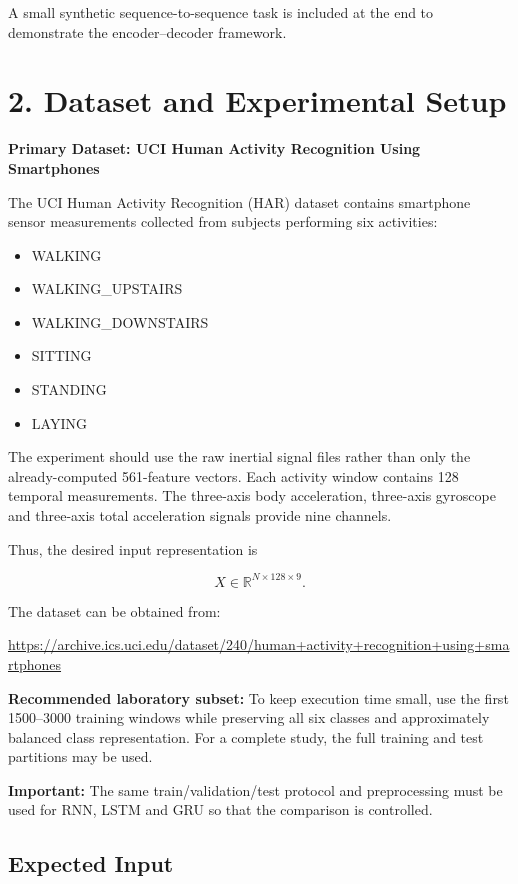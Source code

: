 \documentclass[10pt]{article}
\begin{document}
A small synthetic sequence-to-sequence task is included at the end to
demonstrate the encoder--decoder framework.

\section*{2. Dataset and Experimental Setup}

\textbf{Primary Dataset: UCI Human Activity Recognition Using Smartphones}

The UCI Human Activity Recognition (HAR) dataset contains smartphone sensor
measurements collected from subjects performing six activities:

\begin{itemize}
\item WALKING
\item WALKING\_UPSTAIRS
\item WALKING\_DOWNSTAIRS
\item SITTING
\item STANDING
\item LAYING
\end{itemize}

The experiment should use the raw inertial signal files rather than only the
already-computed 561-feature vectors. Each activity window contains 128
temporal measurements. The three-axis body acceleration, three-axis
gyroscope and three-axis total acceleration signals provide nine channels.

Thus, the desired input representation is

\[
X\in\mathbb{R}^{N\times128\times9}.
\]

The dataset can be obtained from:

\url{https://archive.ics.uci.edu/dataset/240/human+activity+recognition+using+smartphones}

\textbf{Recommended laboratory subset:} To keep execution time small, use
the first 1500--3000 training windows while preserving all six classes and
approximately balanced class representation. For a complete study, the full
training and test partitions may be used.

\textbf{Important:} The same train/validation/test protocol and preprocessing
must be used for RNN, LSTM and GRU so that the comparison is controlled.

\subsection*{Expected Input}
\end{document}
